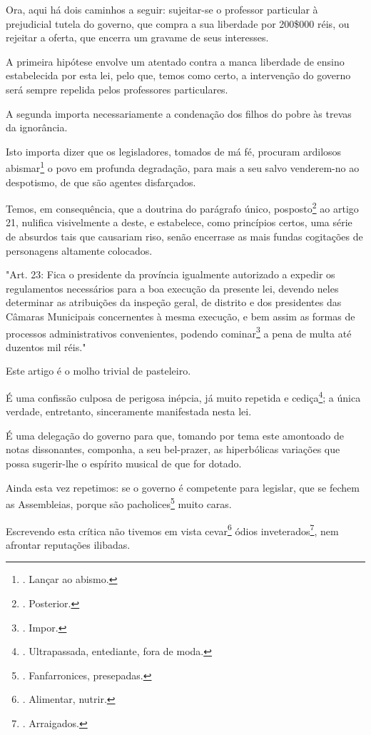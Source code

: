 Ora, aqui há dois caminhos a seguir: sujeitar-se o professor particular
à prejudicial tutela do governo, que compra a sua liberdade por 200\$000
réis, ou rejeitar a oferta, que encerra um gravame de seus interesses.

A primeira hipótese envolve um atentado contra a manca liberdade de
ensino estabelecida por esta lei, pelo que, temos como certo, a
intervenção do governo será sempre repelida pelos professores
particulares.

A segunda importa necessariamente a condenação dos filhos do pobre às
trevas da ignorância.

Isto importa dizer que os legisladores, tomados de má fé, procuram
ardilosos abismar\footnote{. Lançar ao abismo.} o povo em profunda
degradação, para mais a seu salvo venderem-no ao despotismo, de que são
agentes disfarçados.

Temos, em consequência, que a doutrina do parágrafo único,
posposto\footnote{. Posterior.} ao artigo 21, nulifica visivelmente a
deste, e estabelece, como princípios certos, uma série de absurdos tais
que causariam riso, senão encerrase as mais fundas cogitações de
personagens altamente colocados.

"Art. 23: Fica o presidente da província igualmente autorizado a expedir
os regulamentos necessários para a boa execução da presente lei, devendo
neles determinar as atribuições da inspeção geral, de distrito e dos
presidentes das Câmaras Municipais concernentes à mesma execução, e bem
assim as formas de processos administrativos convenientes, podendo
cominar\footnote{. Impor.} a pena de multa até duzentos mil réis."

Este artigo é o molho trivial de pasteleiro.

É uma confissão culposa de perigosa inépcia, já muito repetida e
cediça\footnote{. Ultrapassada, entediante, fora de moda.}; a única
verdade, entretanto, sinceramente manifestada nesta lei.

É uma delegação do governo para que, tomando por tema este amontoado de
notas dissonantes, componha, a seu bel-prazer, as hiperbólicas variações
que possa sugerir-lhe o espírito musical de que for dotado.

Ainda esta vez repetimos: se o governo é competente para legislar, que
se fechem as Assembleias, porque são pacholices\footnote{.
  Fanfarronices, presepadas.} muito caras.

Escrevendo esta crítica não tivemos em vista cevar\footnote{. Alimentar,
  nutrir.} ódios inveterados\footnote{. Arraigados.}, nem afrontar
reputações ilibadas.

